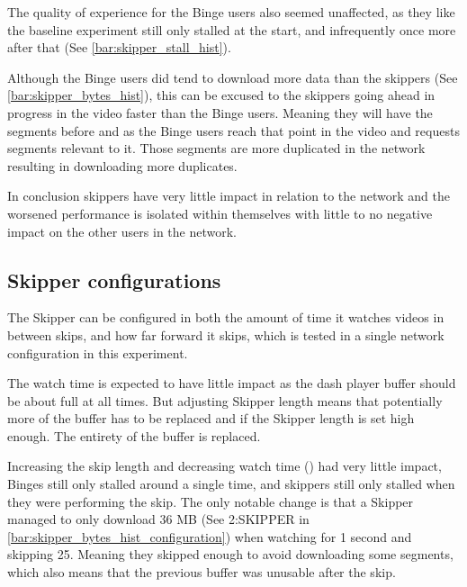 \if{}

\fi

The quality of experience for the Binge users also seemed unaffected, as they like the baseline experiment still only stalled at the start, and infrequently once more after that (See \autoref{bar:skipper_stall_hist}). 

\if{}

\fi


Although the Binge users did tend to download more data than the skippers (See \autoref{bar:skipper_bytes_hist}), this can be excused to the skippers going ahead in progress in the video faster than the Binge users. Meaning they will have the segments before and as the Binge users reach that point in the video and requests segments relevant to it. Those segments are more duplicated in the network resulting in downloading more duplicates.

\if{}

\fi


In conclusion skippers have very little impact in relation to the network and the worsened performance is isolated within themselves with little to no negative impact on the other users in the network.

\subsection{Skipper configurations}
The Skipper can be configured in both the amount of time it watches videos in between skips, and how far forward it skips, which is tested in a single network configuration in this experiment.

The watch time is expected to have little impact as the dash player buffer should be about full at all times. But adjusting Skipper length means that potentially more of the buffer has to be replaced and if the Skipper length is set high enough. The entirety of the buffer is replaced. %

Increasing the skip length and decreasing watch time () had very little impact, Binges still only stalled around a single time, and skippers still only stalled when they were performing the skip. The only notable change is that a Skipper managed to only download 36 \ac{MB} (See 2:SKIPPER in \autoref{bar:skipper_bytes_hist_configuration}) when watching for 1 second and skipping 25. Meaning they skipped enough to avoid downloading some segments, which also means that the previous buffer was unusable after the skip. 

